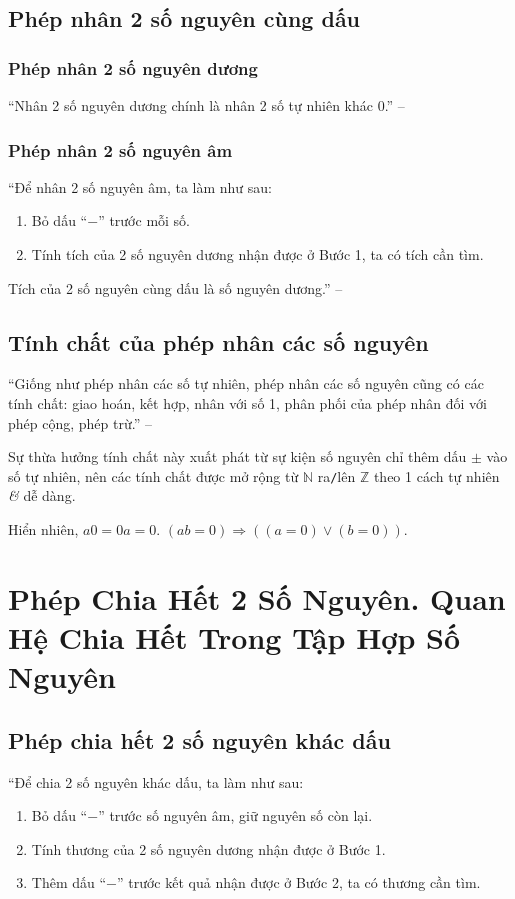 \documentclass[oneside]{book}
\numberwithin{equation}{section}
\begin{document}
\subsection{Phép nhân 2 số nguyên cùng dấu}

\subsubsection{Phép nhân 2 số nguyên dương}
``Nhân 2 số nguyên dương chính là nhân 2 số tự nhiên khác 0.'' -- \cite[p. 81]{Thai_Anh_Dat_Ha_Loan_Nam_Quang_Toan_6_tap_1}

\subsubsection{Phép nhân 2 số nguyên âm}
``Để nhân 2 số nguyên âm, ta làm như sau:
\begin{enumerate}
	\item Bỏ dấu ``$-$'' trước mỗi số.
	\item Tính tích của 2 số nguyên dương nhận được ở Bước 1, ta có tích cần tìm.
\end{enumerate}
Tích của 2 số nguyên cùng dấu là số nguyên dương.'' -- \cite[p. 81]{Thai_Anh_Dat_Ha_Loan_Nam_Quang_Toan_6_tap_1}

\subsection{Tính chất của phép nhân các số nguyên}
``Giống như phép nhân các số tự nhiên, phép nhân các số nguyên cũng có các tính chất: giao hoán, kết hợp, nhân với số 1, phân phối của phép nhân đối với phép cộng, phép trừ.'' -- \cite[p. 82]{Thai_Anh_Dat_Ha_Loan_Nam_Quang_Toan_6_tap_1}

Sự thừa hưởng tính chất này xuất phát từ sự kiện số nguyên chỉ thêm dấu $\pm$ vào số tự nhiên, nên các tính chất được mở rộng từ $\mathbb{N}$ ra\texttt{/}lên $\mathbb{Z}$ theo 1 cách tự nhiên \textit{\&} dễ dàng.

Hiển nhiên, $a0 = 0a = 0$. $(ab = 0)\Rightarrow((a = 0)\lor(b = 0))$.

\section{Phép Chia Hết 2 Số Nguyên. Quan Hệ Chia Hết Trong Tập Hợp Số Nguyên}

\subsection{Phép chia hết 2 số nguyên khác dấu}
``Để chia 2 số nguyên khác dấu, ta làm như sau:
\begin{enumerate}
	\item Bỏ dấu ``$-$'' trước số nguyên âm, giữ nguyên số còn lại.
	\item Tính thương của 2 số nguyên dương nhận được ở Bước 1.
	\item Thêm dấu ``$-$'' trước kết quả nhận được ở Bước 2, ta có thương cần tìm.
\end{enumerate}
\end{document}

